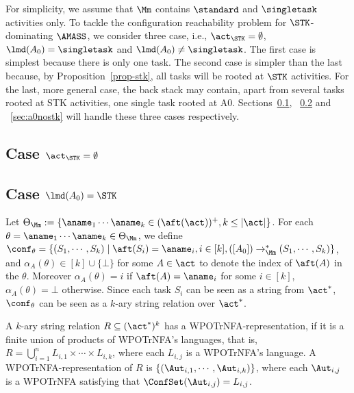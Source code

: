 For simplicity, we assume that $\Mm$ contains $\standard$ and $\singletask$ activities only. To tackle the configuration reachability problem for $\STK$-dominating $\AMASS$, we consider three case, i.e., $\act_{\STK}=\emptyset$, $\lmd(A_0)=\singletask$ and $\lmd(A_0)\neq\singletask$. 
The first case is simplest because there is only one task.
The second case is simpler than the last because, by Proposition~\ref{prop-stk}, all tasks will be rooted at $\STK$ activities. For the last, more general case, the back stack may contain, apart from several tasks rooted at STK activities, one single task rooted at A0.
Sections~\ref{sec:singletask}, ~\ref{sec:a0stk} and ~\ref{sec:a0nostk} will handle these three cases respectively.

\subsection{Case $\act_{\STK}=\emptyset$}\label{sec:singletask}

\subsection{Case $\lmd(A_0)=\STK$}\label{sec:a0stk}
Let $\Theta_\Mm:=\{ \aname_1 \cdots \aname_k \in (\aft(\act))^+, k \le |\act|\}$. For each $\theta=\aname_1 \cdots \aname_k \in \Theta_\Mm$, we define $\conf_\theta = \{(S_1, \cdots, S_k) \mid \aft(S_i) =\aname_i, i\in[k],  ([A_0]) \rightarrow_\Mm^* (S_1, \cdots, S_k)\}$, and $\alpha_A(\theta)\in[k]\cup\{\bot\}$ for some $A\in\act$ to denote the index of $\aft(A)$ in the $\theta$. Moreover $\alpha_A(\theta) = i$ if $\aft(A) = \aname_i$ for some $i\in[k]$, $\alpha_A(\theta) = \bot$ otherwise. Since each task $S_i$ can be seen as a string from $\act^*$, $\conf_\theta$ can be seen as a $k$-ary string relation over $\act^*$. 

\begin{definition}[WPOTrNFA-representation]
A $k$-ary string relation $R \subseteq (\act^*)^k$ has a WPOTrNFA-representation, if it is a finite union of products of WPOTrNFA's languages, that is, $R=\bigcup \limits_{i =1 }^n L_{i,1} \times \cdots \times L_{i, k}$, where each $L_{i,j}$ is a WPOTrNFA's language.
A WPOTrNFA-representation of $R$ is $\{(\Aut_{i,1},\cdots,\Aut_{i,k})\}$, where each $\Aut_{i,j}$ is a WPOTrNFA satisfying that $\ConfSet(\Aut_{i,j})= L_{i,j}$.
\end{definition}
%

